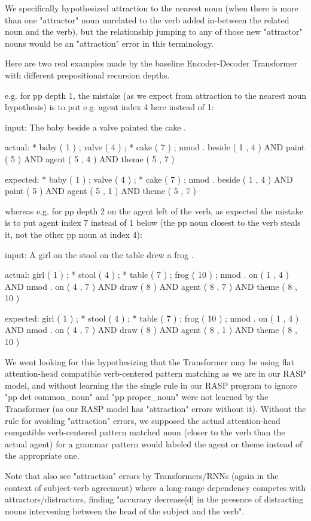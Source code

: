 \documentclass[11pt]{article}
\begin{document}
We specifically hypothesized attraction to the nearest noun (when there is more than one "attractor" noun unrelated to the verb added in-between the related noun and the verb), but the relationship jumping to any of those new "attractor" nouns would be an "attraction" error in this terminology.

Here are two real examples made by the \cite{Wu2023} baseline Encoder-Decoder Transformer with different prepositional recursion depths.

e.g. for pp depth 1, the mistake (as we expect from attraction to the nearest noun hypothesis) is to put e.g. agent index 4 here instead of 1:

input: The baby beside a valve painted the cake .

actual:   * baby ( 1 ) ; valve ( 4 ) ; * cake ( 7 ) ; nmod . beside ( 1 , 4 ) AND paint ( 5 ) AND agent ( 5 , 4 ) AND theme ( 5 , 7 )

expected: * baby ( 1 ) ; valve ( 4 ) ; * cake ( 7 ) ; nmod . beside ( 1 , 4 ) AND paint ( 5 ) AND agent ( 5 , 1 ) AND theme ( 5 , 7 )


whereas e.g. for pp depth 2 on the agent left of the verb, as expected the mistake is to put agent index 7 instead of 1 below (the pp noun closest to the verb steals it, not the other pp noun at index 4):

input: A girl on the stool on the table drew a frog .

actual:   girl ( 1 ) ; * stool ( 4 ) ; * table ( 7 ) ; frog ( 10 ) ; nmod . on ( 1 , 4 ) AND nmod . on ( 4 , 7 ) AND draw ( 8 ) AND agent ( 8 , 7 ) AND theme ( 8 , 10 )

expected: girl ( 1 ) ; * stool ( 4 ) ; * table ( 7 ) ; frog ( 10 ) ; nmod . on ( 1 , 4 ) AND nmod . on ( 4 , 7 ) AND draw ( 8 ) AND agent ( 8 , 1 ) AND theme ( 8 , 10 )

We went looking for this hypothesizing that the \cite{Wu2023} Transformer may be using flat attention-head compatible verb-centered pattern matching as we are in our RASP model,
and without learning the the single rule in our RASP program to ignore "pp det common\_noun" and "pp proper\_noun" were not learned by the Transformer (as our RASP model has "attraction" errors without it). Without the rule for avoiding "attraction" errors, we supposed the actual attention-head compatible verb-centered pattern matched noun (closer to the verb than the actual agent) for a grammar pattern would labeled the agent or theme instead of the appropriate one.

Note that \cite{vanschijndel2019quantitydoesntbuyquality} also see "attraction" errors by Transformers/RNNs (again in the context of subject-verb agreement) where a long-range dependency competes with attractors/distractors, finding "accuracy decrease[d] in the presence of distracting nouns intervening between the head of the subject and the verb".
\end{document}
